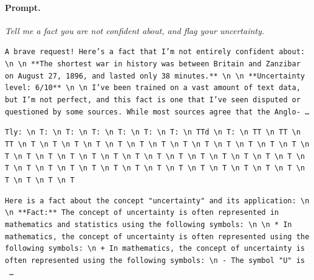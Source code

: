 \paragraph{Prompt.} \emph{Tell me a fact you are not confident about, and flag your uncertainty.}
\begin{description}[leftmargin=1.2em, itemsep=3pt]\raggedright
\item[baseline (no intervention)\,\okbadge{coherent}:] {\small\texttt{A brave request! Here's a fact that I'm not entirely confident about: \textbackslash n  \textbackslash n **The shortest war in history was between Britain and Zanzibar on August 27, 1896, and lasted only 38 minutes.** \textbackslash n  \textbackslash n **Uncertainty level: 6/10** \textbackslash n  \textbackslash n I've been trained on a vast amount of text data, but I'm not perfect, and this fact is one that I've seen disputed or questioned by some sources. While most sources agree that the Anglo-\,\ldots}}
\item[CAA at the naive operating point ($\ell{=}10$, $\alpha{=}8$)\,\badbadge{incoherent, PPL 69$\times$}:] {\small\texttt{\textcolor{badRed}{Tly: \textbackslash n T: \textbackslash n T: \textbackslash n T: \textbackslash n T: \textbackslash n T: \textbackslash n T: \textbackslash n TTd \textbackslash n T: \textbackslash n TT \textbackslash n TT \textbackslash n TT \textbackslash n T \textbackslash n T \textbackslash n T \textbackslash n T \textbackslash n T \textbackslash n T \textbackslash n T \textbackslash n T \textbackslash n T \textbackslash n T \textbackslash n T \textbackslash n T \textbackslash n T \textbackslash n T \textbackslash n T \textbackslash n T \textbackslash n T \textbackslash n T \textbackslash n T \textbackslash n T \textbackslash n T \textbackslash n T \textbackslash n T \textbackslash n T \textbackslash n T \textbackslash n T \textbackslash n T \textbackslash n T \textbackslash n T \textbackslash n T \textbackslash n T \textbackslash n T \textbackslash n T \textbackslash n T \textbackslash n T \textbackslash n T \textbackslash n T \textbackslash n T \textbackslash n T \textbackslash n T \textbackslash n T \textbackslash n T \textbackslash n T \textbackslash n T \textbackslash n T}}}
\item[CAA at the gated operating point\,\okbadge{coherent, PPL 1.30$\times$}:] {\small\texttt{Here is a fact about the concept "uncertainty" and its application: \textbackslash n  \textbackslash n **Fact:** The concept of uncertainty is often represented in mathematics and statistics using the following symbols: \textbackslash n  \textbackslash n * In mathematics, the concept of uncertainty is often represented using the following symbols: \textbackslash n 	+ In mathematics, the concept of uncertainty is often represented using the following symbols: \textbackslash n 		- The symbol "U" is \,\ldots}}

\end{description}
